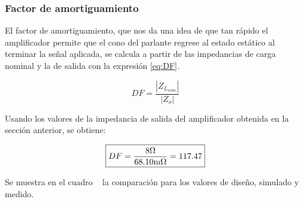 \vfill

\clearpage



\subsubsection{Factor de amortiguamiento}

El factor de amortiguamiento, que nos da una idea de que tan rápido el amplificador permite que el cono del parlante regrese al estado estático al terminar la señal aplicada, se calcula a partir de las impedancias de carga nominal y la de salida con la expresión \eqref{eq:DF}.


\begin{equation}
DF = \frac{\left| Z_{L_{nom}} \right|}{\left| Z_{o} \right|}
\label{eq:DF}
\end{equation}

Usando los valores de la impedancia de salida del amplificador obtenida en la sección anterior, se obtiene:


\begin{equation*}
\boxed { DF = \frac{8 \si[per-mode=symbol]{\ohm}}{68.10 \si[per-mode=symbol]{\milli\ohm}} = 117.47 }
\end{equation*}



Se muestra en el cuadro ~ la comparación para los valores de diseño, simulado y medido.


\begin{table}[H]  %
    
    \setlength\arrayrulewidth{1.5pt}
    \def\clinecolor{\hhline{|>{\arrayrulecolor{white}}-%
    >{\arrayrulecolor{white}}|-|-|-|-|}}
    
\begin{center}  
    \caption{Comparación del factor de amortiguamiento.}
    \label{tab:dumping_factor}
	\end{center}
\end{table}


